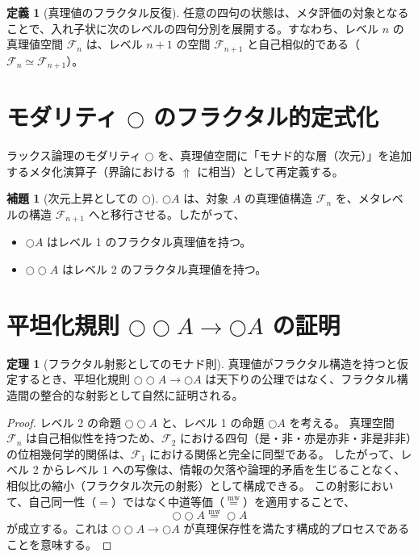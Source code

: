 \documentclass[11pt,a4paper]{article}
\theoremstyle{definition}
\newtheorem{definition}{定義}[section]
\newtheorem{theorem}{定理}[section]
\newtheorem{lemma}{補題}[section]
\newcommand{\mweq}{\mathrel{\overset{\mathrm{mw}}{=}}}
\newcommand{\metanegation}{\Uparrow}
\newcommand{\Lax}{\bigcirc} %
\begin{document}
\begin{definition}[真理値のフラクタル反復]
任意の四句の状態は、メタ評価の対象となることで、入れ子状に次のレベルの四句分別を展開する。すなわち、レベル $n$ の真理値空間 $\mathcal{F}_n$ は、レベル $n+1$ の空間 $\mathcal{F}_{n+1}$ と自己相似的である（$\mathcal{F}_n \simeq \mathcal{F}_{n+1}$）。
\end{definition}

\section{モダリティ $\Lax$ のフラクタル的定式化}

ラックス論理のモダリティ $\Lax$ を、真理値空間に「モナド的な層（次元）」を追加するメタ化演算子（界論における $\metanegation$ に相当）として再定義する。

\begin{lemma}[次元上昇としての $\Lax$]
$\Lax A$ は、対象 $A$ の真理値構造 $\mathcal{F}_n$ を、メタレベルの構造 $\mathcal{F}_{n+1}$ へと移行させる。したがって、
\begin{itemize}
    \item $\Lax A$ はレベル 1 のフラクタル真理値を持つ。
    \item $\Lax\Lax A$ はレベル 2 のフラクタル真理値を持つ。
\end{itemize}
\end{lemma}

\section{平坦化規則 $\Lax\Lax A \to \Lax A$ の証明}

\begin{theorem}[フラクタル射影としてのモナド則]
真理値がフラクタル構造を持つと仮定するとき、平坦化規則 $\Lax\Lax A \to \Lax A$ は天下りの公理ではなく、フラクタル構造間の整合的な射影として自然に証明される。
\end{theorem}
\begin{proof}
レベル 2 の命題 $\Lax\Lax A$ と、レベル 1 の命題 $\Lax A$ を考える。
真理空間 $\mathcal{F}_n$ は自己相似性を持つため、$\mathcal{F}_2$ における四句（是・非・亦是亦非・非是非非）の位相幾何学的関係は、$\mathcal{F}_1$ における関係と完全に同型である。
したがって、レベル 2 からレベル 1 への写像は、情報の欠落や論理的矛盾を生じることなく、相似比の縮小（フラクタル次元の射影）として構成できる。
この射影において、自己同一性（$=$）ではなく中道等価（$\mweq$）を適用することで、
$$ \Lax\Lax A \mweq \Lax A $$
が成立する。これは $\Lax\Lax A \to \Lax A$ が真理保存性を満たす構成的プロセスであることを意味する。
\end{proof}
\end{document}
